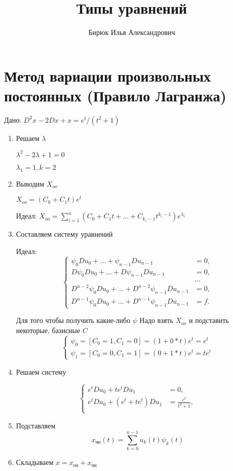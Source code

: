 \documentclass{article}
\title{Типы уравнений}
\author{Бирюк Илья Александрович}
\begin{document}
\maketitle
\newpage
\tableofcontents
\newpage
\section{Метод вариации произвольных постоянных (Правило Лагранжа)}
Дано: $D^2x-2Dx+x=e^t/(t^2+1)$
\begin{enumerate}
    \item Решаем $\lambda$

    $\lambda^2-2\lambda+1=0$
    
    $\lambda_1=1,k=2$
    \item Выводим $X_{oo}$
    
    $X_{oo}=(C_0+C_{1}t)e^{t}$

    Идеал: $X_{oo}=\sum_{i=1}^{n}(C_0+C_1t+\dots+C_{k_{i}-1}t^{k_i-1})e^{\lambda_i}$

    \item Составляем систему уравнений
    
    Идеал: 
    \[
\left\{
\begin{aligned}
    \psi_0 D u_0 + \dots + \psi_{n-1} D u_{n-1} &= 0, \\
    D \psi_0 D u_0 + \dots + D \psi_{n-1} D u_{n-1} &= 0, \\
    & \dots \\
    D^{n-2} \psi_0 D u_0 + \dots + D^{n-2} \psi_{n-1} D u_{n-1} &= 0, \\
    D^{n-1} \psi_0 D u_0 + \dots + D^{n-1} \psi_{n-1} D u_{n-1} &= f.
\end{aligned}
\right.
\]

Для того чтобы получить какие-либо $\psi$ Надо взять $X_{oo}$ и подставить некоторые, базисные $C$
\[
\left\{
\begin{aligned}
    \psi_0 = [C_0 = 1, C_1 = 0] = (1+0*t)e^{t} =  e^{t} \\
    \psi_1 = [C_0 = 0, C_1 = 1] = (0+1*t)e^{t} = te^{t}
\end{aligned}
\right.
\]
    \item Решаем систему
    
\[
\left\{
\begin{aligned}
    e^{t} D u_0 + te^{t} D u_{1} &= 0, \\
    e^{t} D u_0 + (e^{t}+te^{t}) D u_{1} &= \frac{e^{t}}{t^2+1}, \\
\end{aligned}
\right.
\]    

    \item Подставляем
    $$x_{\text{чн}}(t) = \sum_{k=0}^{n-1} u_k(t) \psi_k(t)$$
    \item Складываем
    $x=x_{\text{оо}}+x_{\text{чн}}$
\end{enumerate}
\newpage
\end{document}
